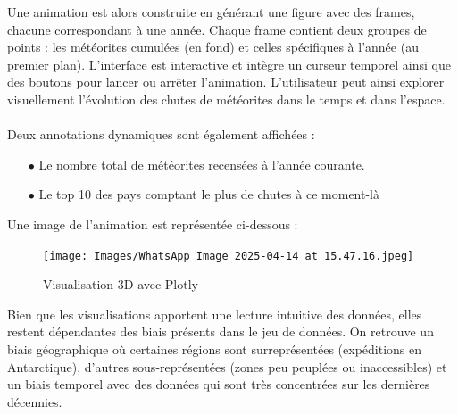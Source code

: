 \documentclass[12pt]{article}
\begin{document}
\vspace{0.3cm}
Une animation est alors construite en générant une figure avec des frames, chacune correspondant à une année. Chaque frame contient deux groupes de points : les météorites cumulées (en fond) et celles spécifiques à l’année (au premier plan). L’interface est interactive et intègre un curseur temporel ainsi que des boutons pour lancer ou arrêter l’animation. L’utilisateur peut ainsi explorer visuellement l’évolution des chutes de météorites dans le temps et dans l’espace.\\
\\
Deux annotations dynamiques sont également affichées :\\
\begin{itemize}
    \item[$\bullet$] Le nombre total de météorites recensées à l’année courante.
    \item[$\bullet$] Le top 10 des pays comptant le plus de chutes à ce moment-là
\end{itemize}
\vspace{0.3cm}
Une image de l'animation est représentée ci-dessous :\\
\begin{figure}[H]
    \centering
    \texttt{[image: Images/WhatsApp Image 2025-04-14 at 15.47.16.jpeg]}
    \caption{Visualisation 3D avec Plotly}
\end{figure}
\vspace{0.3cm}
Bien que les visualisations apportent une lecture intuitive des données, elles restent dépendantes des biais présents dans le jeu de données. On retrouve un biais géographique où certaines régions sont surreprésentées (expéditions en Antarctique), d'autres sous-représentées (zones peu peuplées ou inaccessibles) et un biais temporel avec des données qui sont très concentrées sur les dernières décennies.
\end{document}
